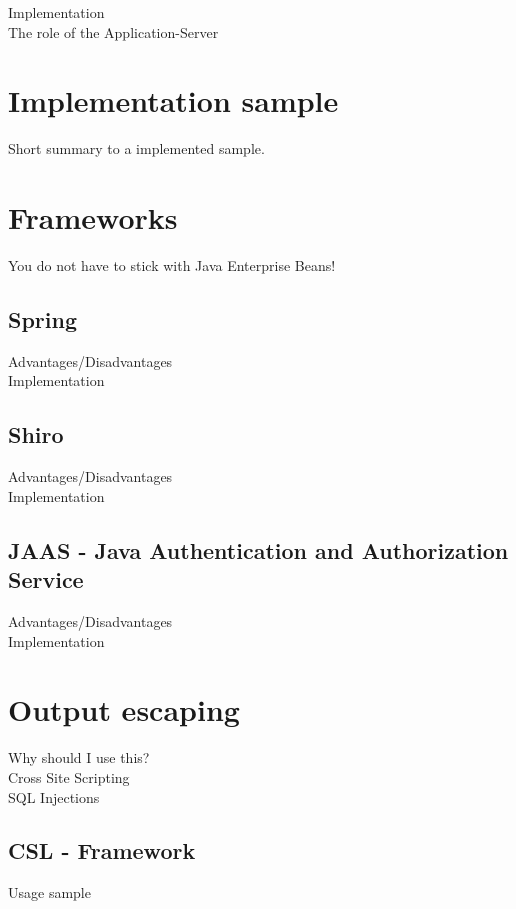 \documentclass[12pt,a4paper,draft]{report}
\begin{document}
Implementation\\
The role of the Application-Server

\section{Implementation sample}
Short summary to a implemented sample.

\section{Frameworks}
You do not have to stick with Java Enterprise Beans!

\subsection{Spring}
Advantages/Disadvantages\\
Implementation

\subsection{Shiro}
Advantages/Disadvantages\\
Implementation

\subsection{JAAS - Java Authentication and Authorization Service}
Advantages/Disadvantages\\
Implementation

\section{Output escaping}
Why should I use this?\\
Cross Site Scripting\\
SQL Injections
\subsection{CSL - Framework}
Usage sample
\end{document}
